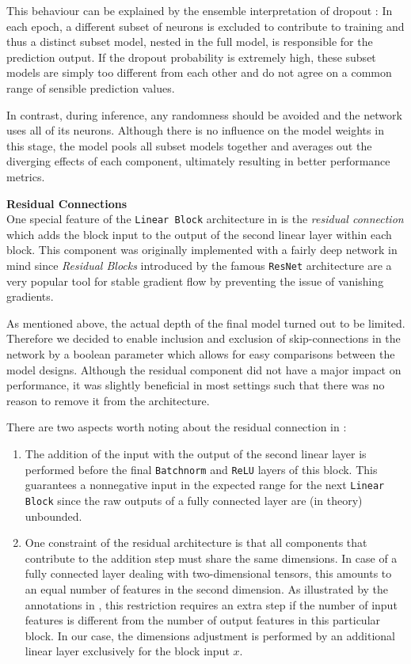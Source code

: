 This behaviour can be explained by the ensemble interpretation of dropout \citep{goodfellow2016}:
In each epoch, a different subset of neurons is excluded to contribute to training and thus a distinct subset model, nested in the full model, is responsible for the prediction output.
If the dropout probability is extremely high, these subset models are simply too different from each other and do not agree on a common range of sensible prediction values.

In contrast, during inference, any randomness should be avoided and the network uses all of its neurons.
Although there is no influence on the model weights in this stage, the model pools all subset models together and averages out the diverging effects of each component, ultimately resulting in better performance metrics.

\textbf{Residual Connections} \\
One special feature of the \texttt{Linear Block} architecture in  is the \emph{residual connection} which adds the block input to the output of the second linear layer within each block.
This component was originally implemented with a fairly deep network in mind since \emph{Residual Blocks} introduced by the famous \texttt{ResNet} architecture \citep{he2015} are a very popular tool for stable gradient flow by preventing the issue of vanishing gradients.

As mentioned above, the actual depth of the final model turned out to be limited.
Therefore we decided to enable inclusion and exclusion of skip-connections in the network by a boolean parameter which allows for easy comparisons between the model designs.
Although the residual component did not have a major impact on performance, it was slightly beneficial in most settings such that there was no reason to remove it from the architecture.

There are two aspects worth noting about the residual connection in :
\begin{enumerate}
  \item The addition of the input with the output of the second linear layer is performed before the final \texttt{Batchnorm} and \texttt{ReLU} layers of this block.
        This guarantees a nonnegative input in the expected range for the next \texttt{Linear Block} since the raw outputs of a fully connected layer are (in theory) unbounded.

  \item One constraint of the residual architecture is that all components that contribute to the addition step must share the same dimensions.
        In case of a fully connected layer dealing with two-dimensional tensors, this amounts to an equal number of features in the second dimension.
        As illustrated by the annotations in , this restriction requires an extra step if the number of input features is different from the number of output features in this particular block.
        In our case, the dimensions adjustment is performed by an additional linear layer exclusively for the block input $x$.
\end{enumerate}


